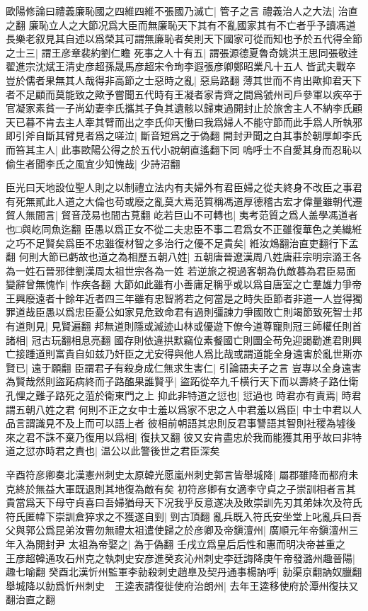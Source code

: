 歐陽修論曰禮義廉恥國之四維四維不張國乃滅亡|{
	管子之言}
禮義治人之大法|{
	治直之翻}
廉恥立人之大節况爲大臣而無廉恥天下其有不亂國家其有不亡者乎予讀馮道長樂老叙見其自述以爲榮其可謂無廉恥者矣則天下國家可從而知也予於五代得全節之士三|{
	謂王彦章裴約劉仁瞻}
死事之人十有五|{
	謂張源德夏魯奇姚洪王思同張敬逹翟進宗沈斌王清史彦超孫晟馬彦超宋令珣李遐張彦卿鄭昭業凡十五人}
皆武夫戰卒豈於儒者果無其人哉得非高節之士惡時之亂|{
	惡烏路翻}
薄其世而不肯出歟抑君天下者不足顧而莫能致之歟予嘗聞五代時有王凝者家青齊之間爲虢州司戶參軍以疾卒于官凝家素貧一子尚幼妻李氏攜其子負其遺骸以歸東過開封止於旅舍主人不納李氏顧天已暮不肯去主人牽其臂而出之李氏仰天慟曰我爲婦人不能守節而此手爲人所執邪即引斧自斷其臂見者爲之嗟泣|{
	斷音短爲之于偽翻}
開封尹聞之白其事於朝厚卹李氏而笞其主人|{
	此事歐陽公得之於五代小說朝直遙翻下同}
嗚呼士不自愛其身而忍恥以偷生者聞李氏之風宜少知愧哉|{
	少詩沼翻}


臣光曰天地設位聖人則之以制禮立法内有夫婦外有君臣婦之從夫終身不改臣之事君有死無貳此人道之大倫也苟或廢之亂莫大焉范質稱馮道厚德稽古宏才偉量雖朝代遷貿人無間言|{
	貿音茂易也間古莧翻}
屹若巨山不可轉也|{
	夷考范質之爲人盖學馮道者也□與屹同魚迄翻}
臣愚以爲正女不從二夫忠臣不事二君爲女不正雖復華色之美織絍之巧不足賢矣爲臣不忠雖復材智之多治行之優不足貴矣|{
	絍汝鴆翻治直吏翻行下孟翻}
何則大節已虧故也道之為相歷五朝八姓|{
	五朝唐晉遼漢周八姓唐莊宗明宗潞王各為一姓石晉邪律劉漢周太祖世宗各為一姓}
若逆旅之視過客朝為仇敵暮為君臣易面變辭曾無愧怍|{
	怍疾各翻}
大節如此雖有小善庸足稱乎或以爲自唐室之亡羣雄力爭帝王興廢遠者十餘年近者四三年雖有忠智將若之何當是之時失臣節者非道一人豈得獨罪道哉臣愚以爲忠臣憂公如家見危致命君有過則彊諫力爭國敗亡則竭節致死智士邦有道則見|{
	見賢遍翻}
邦無道則隱或滅迹山林或優遊下僚今道尊寵則冠三師權任則首諸相|{
	冠古玩翻相息亮翻}
國存則依違拱默竊位素餐國亡則圖全苟免迎謁勸進君則興亡接踵道則富貴自如兹乃奸臣之尤安得與他人爲比哉或謂道能全身遠害於亂世斯亦賢已|{
	遠于願翻}
臣謂君子有殺身成仁無求生害仁|{
	引論語夫子之言}
豈專以全身遠害為賢哉然則盜跖病終而子路醢果誰賢乎|{
	盜跖從卒九千横行天下而以壽終子路仕衛孔悝之難子路死之菹於衛東門之上}
抑此非特道之愆也|{
	愆過也}
時君亦有責焉|{
	時君謂五朝八姓之君}
何則不正之女中士羞以爲家不忠之人中君羞以爲臣|{
	中士中君以人品言謂識見不及上而可以語上者}
彼相前朝語其忠則反君事讐語其智則社稷為墟後來之君不誅不棄乃復用以爲相|{
	復扶又翻}
彼又安肯盡忠於我而能獲其用乎故曰非特道之愆亦時君之責也|{
	温公以此警後世之君臣深矣}


辛酉符彦卿奏北漢憲州刺史太原韓光愿嵐州刺史郭言皆舉城降|{
	屬郡雖降而都府未克終於無益大軍既退則其地復為敵有矣}
初符彦卿有女適李守貞之子崇訓相者言其貴當爲天下母守貞喜曰吾婦猶母天下况我乎反意遂决及敗崇訓先刃其弟妹次及符氏符氏匿幃下崇訓倉猝求之不獲遂自剄|{
	剄古頂翻}
亂兵既入符氏安坐堂上叱亂兵曰吾父與郭公爲昆弟汝曹勿無禮太祖遣使歸之於彦卿及帝鎭澶州|{
	廣順元年帝鎭澶州三年入為開封尹}
太祖為帝娶之|{
	為于偽翻}
壬戌立爲皇后后性和惠而明决帝甚重之　王彦超韓通攻石州克之執刺史安彦進癸亥沁州刺史李廷誨降庚午帝發潞州趣晉陽|{
	趣七喻翻}
癸酉北漢忻州監軍李勍殺刺史趙臯及契丹通事楊訥呼|{
	勍渠京翻訥奴臘翻}
舉城降以勍爲忻州刺史　王逵表請復徙使府治朗州|{
	去年王逵移使府於潭州復扶又翻治直之翻}


